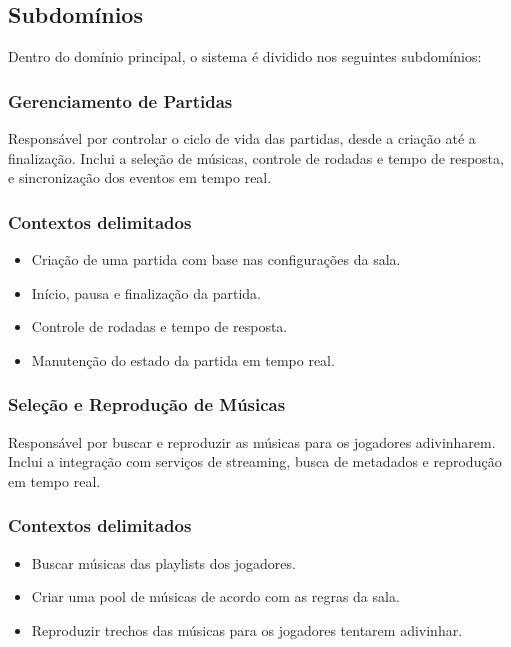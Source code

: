     \subsection{Subdomínios}
    Dentro do domínio principal, o sistema é dividido nos seguintes subdomínios:

    \subsubsection{Gerenciamento de Partidas}
        Responsável por controlar o ciclo de vida das partidas, desde a criação até a finalização. Inclui a seleção de músicas, controle de rodadas e tempo de resposta, e sincronização dos eventos em tempo real.
        \subsubsection{Contextos delimitados}
        \begin{itemize}
            \item Criação de uma partida com base nas configurações da sala.
            \item Início, pausa e finalização da partida.
            \item Controle de rodadas e tempo de resposta.
            \item Manutenção do estado da partida em tempo real.
        \end{itemize}
    
    \subsubsection{Seleção e Reprodução de Músicas}
        Responsável por buscar e reproduzir as músicas para os jogadores adivinharem. Inclui a integração com serviços de streaming, busca de metadados e reprodução em tempo real.
        \subsubsection{Contextos delimitados}
        \begin{itemize}
            \item Buscar músicas das playlists dos jogadores.
            \item Criar uma pool de músicas de acordo com as regras da sala.
            \item Reproduzir trechos das músicas para os jogadores tentarem adivinhar.
        \end{itemize}


